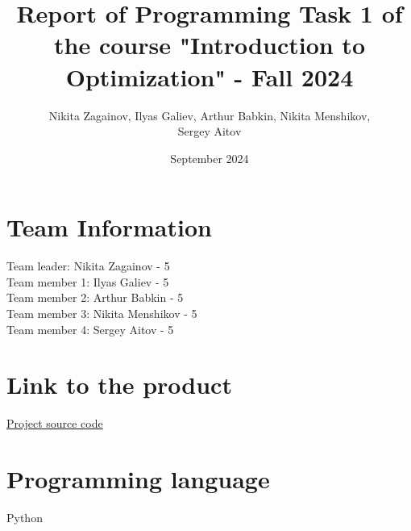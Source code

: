 \documentclass{article}
\title{Report of Programming Task 1 of the course "Introduction to Optimization" - Fall 2024}
\author{Nikita Zagainov, Ilyas Galiev, Arthur Babkin, Nikita Menshikov, \\ Sergey Aitov}
\date{September 2024}
\begin{document}
\maketitle

\section{Team Information}
\noindent
Team leader: Nikita Zagainov - 5 \\
Team member 1: Ilyas Galiev - 5 \\
Team member 2: Arthur Babkin - 5 \\
Team member 3: Nikita Menshikov - 5 \\
Team member 4: Sergey Aitov - 5

\section{Link to the product}
\href{https://github.com/V1adych/simplex}{Project source code}

\section{Programming language}
Python
\end{document}
